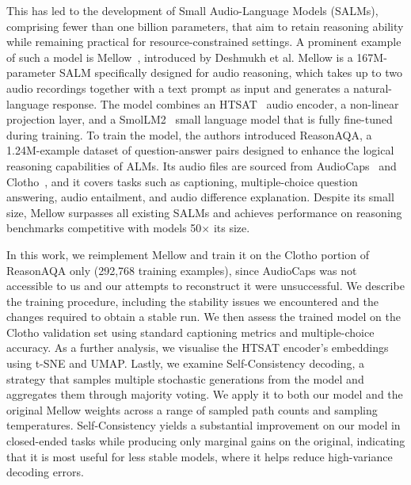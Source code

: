 \documentclass[cameraready]{Interspeech}
\begin{document}
This has led to the development of Small Audio-Language Models (SALMs), comprising fewer than one billion parameters, that aim to retain reasoning ability while remaining practical for resource-constrained settings. A prominent example of such a model is Mellow~\cite{mellow}, introduced by Deshmukh et al. Mellow is a 167M-parameter SALM specifically designed for audio reasoning, which takes up to two audio recordings together with a text prompt as input and generates a natural-language response. The model combines an HTSAT~\cite{chen2022HTSAT} audio encoder, a non-linear projection layer, and a SmolLM2~\cite{smollm2} small language model that is fully fine-tuned during training. To train the model, the authors introduced ReasonAQA, a 1.24M-example dataset of question-answer pairs designed to enhance the logical reasoning capabilities of ALMs. Its audio files are sourced from AudioCaps~\cite{kim2019audiocaps} and Clotho~\cite{drossos2020clotho}, and it covers tasks such as captioning, multiple-choice question answering, audio entailment, and audio difference explanation. Despite its small size, Mellow surpasses all existing SALMs and achieves performance on reasoning benchmarks competitive with models 50$\times$ its size.

In this work, we reimplement Mellow and train it on the Clotho portion of ReasonAQA only (292,768 training examples), since AudioCaps was not accessible to us and our attempts to reconstruct it were unsuccessful. We describe the training procedure, including the stability issues we encountered and the changes required to obtain a stable run. We then assess the trained model on the Clotho validation set using standard captioning metrics and multiple-choice accuracy. As a further analysis, we visualise the HTSAT encoder's embeddings using t-SNE and UMAP. Lastly, we examine Self-Consistency decoding, a strategy that samples multiple stochastic generations from the model and aggregates them through majority voting. We apply it to both our model and the original Mellow weights across a range of sampled path counts and sampling temperatures. Self-Consistency yields a substantial improvement on our model in closed-ended tasks while producing only marginal gains on the original, indicating that it is most useful for less stable models, where it helps reduce high-variance decoding errors.
\end{document}
